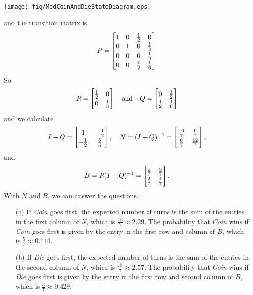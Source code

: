 \documentclass[reqno]{immbook}
\newcommand{\T}{\rule{0pt}{2.6ex}}
\newcommand{\B}{\rule[-1.2ex]{0pt}{0pt}}
\begin{document}
\medskip
\centerline{%
\texttt{[image: fig/ModCoinAndDieStateDiagram.eps]}
}
and the transition matrix is
\[
P = \begin{bmatrix}
        1  &  0  & \frac{1}{2} & 0 \T \B \\
	0  &  1  &   0         & \frac{1}{3} \B \\
	0  &  0  &   0         & \frac{1}{2} \B \\
	0  &  0  & \frac{1}{2} & \frac{1}{6} \B \\
    \end{bmatrix}
\]
So
\[
  R = \begin{bmatrix}
          \frac{1}{2} & 0 \T\B \\
	      0       & \frac{1}{3} \B 
      \end{bmatrix}
  \quad \textrm{and}\quad
  Q = \begin{bmatrix}
          0 & \frac{1}{2} \T\B \\
	  \frac{1}{2}    & \frac{1}{6} \B 
      \end{bmatrix}
\]
and we calculate
\[
I-Q = \begin{bmatrix}
          1 & -\frac{1}{2} \T\B \\
	  -\frac{1}{2}    & \frac{5}{6} \B 
      \end{bmatrix},
 \quad
N = (I-Q)^{-1} =
      \begin{bmatrix}
          \frac{10}{7} & \frac{6}{7} \T\B \\
	  \frac{6}{7}  & \frac{12}{7} \B 
      \end{bmatrix},
\]
and
\[
B = R(I-Q)^{-1} =
      \begin{bmatrix}
          \frac{5}{7} & \frac{3}{7} \T\B \\
	  \frac{2}{7}  & \frac{4}{7} \B 
      \end{bmatrix}.
\]
With $N$ and $B$, we can answer the questions.
\begin{enumerate}
\item[(a)] If \emph{Coin} goes first, the expected number
of turns is the sum of the entries in the first column
of $N$, which is $\frac{16}{7} \approx 2.29$.
The probability that \emph{Coin} wins if \emph{Coin}
goes first is given by the entry in the first
row and column of $B$, which is
$\frac{5}{7} \approx 0.714$.
\item[(b)] If \emph{Die} goes first, the expected number
of turns is the sum of the entries in the second column
of $N$, which is $\frac{18}{7} \approx 2.57$.
The probability that \emph{Coin} wins if \emph{Die}
goes first is given by the entry in the first
row and second column of $B$, which is
$\frac{3}{7} \approx 0.429$.
\end{enumerate}
\end{document}
